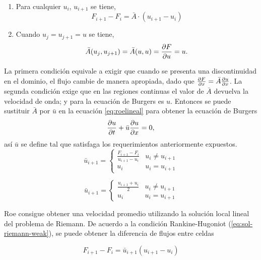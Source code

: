 \documentclass[12pt]{article}
\begin{document}
	\begin{enumerate}
		\item Para cualquier $u_{i}$, $u_{i+1}$ se tiene,
		\begin{equation}
				F_{i+1}-F_{i} = \bar{A} \cdot (u_{i+1} - u_{i})
		\end{equation}
		\item Cuando $u_{j} = u_{j+1} = u$ se tiene,
		\begin{equation}
				\bar{A}(u_j, u_{j+1}) = \bar{A}(u,u) = \pdv{F}{u} = u.
		\end{equation}
	\end{enumerate}
		
	La primera condición equivale a exigir que cuando se presenta una discontinuidad en el dominio, el flujo cambie de manera apropiada, dado que $\pdv{F}{x} = \bar{A} \pdv{u}{x}$. La segunda condición exige que en las regiones continuas el valor de $\bar{A}$ devuelva la velocidad de onda; y para la ecuación de Burgers es $u$. Entonces se puede sustituir $\bar{A}$ por $\bar{u}$ en la ecuación \ref{eq:roelineal} para obtener la ecuación de Burgers
	\begin{equation}
		\pdv{u}{t} + \bar{u} \pdv{u}{x} = 0,
	\end{equation}
	así $\bar{u}$ se define tal que satisfaga los requerimientos anteriormente expuestos.
	\begin{equation}
		\bar{u}_{i+1} =
		\begin{cases}
			\frac{F_{i+1} - F_{i}}{u_{i+1} - u_{i}} & u_{i} \neq u_{i+1}\\
			u_{i} & u_{i} = u_{i+1} 
		\end{cases}
	\end{equation}
	
	\begin{equation}
		\bar{u}_{i+1} =
		\begin{cases}
			\frac{u_{i+1} + u_{i}}{2} & u_{i} \neq u_{i+1}\\
			u_{i} & u_{i} = u_{i+1} 
		\end{cases}
	\label{eq:u-prom}
	\end{equation}
	
	Roe consigue obtener una velocidad promedio utilizando la solución local lineal del problema de Riemann. De acuerdo a la condición Rankine-Hugoniot (\ref{eq:sol-riemann-weak}), se puede obtener la diferencia de flujos entre celdas \cite{pletcher1997computational}
	
	\begin{equation}
		F_{i+1} - F_{i} = \bar{u}_{i+1}\left(u_{i+1}-u_{i} \right) 
	\end{equation}
\end{document}
